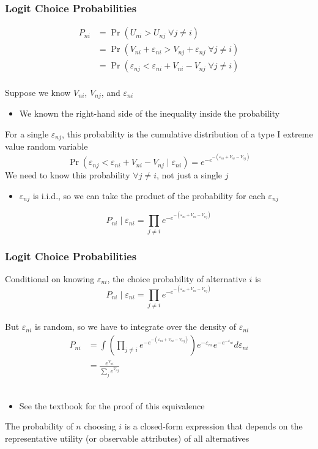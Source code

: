 \documentclass{beamer}
\begin{document}
\begin{frame}\frametitle{Logit Choice Probabilities}
	\vspace{-4ex}
    \begin{align*}
    	P_{ni} & = \Pr(U_{ni} > U_{nj} \; \forall j \neq i) \\
    	& = \Pr(V_{ni} + \varepsilon_{ni} > V_{nj} + \varepsilon_{nj} \; \forall j \neq i) \\
    	& = \Pr(\varepsilon_{nj} < \varepsilon_{ni} + V_{ni} - V_{nj} \; \forall j \neq i)
    \end{align*} \\
    \vspace{1ex}
    Suppose we know $V_{ni}$, $V_{nj}$, and $\varepsilon_{ni}$
    \begin{itemize}
        \item We known the right-hand side of the inequality inside the probability
    \end{itemize}
    \vspace{2ex}
    For a single $\varepsilon_{nj}$, this probability is the cumulative distribution of a type I extreme value random variable
    $$\Pr(\varepsilon_{nj} < \varepsilon_{ni} + V_{ni} - V_{nj} \mid \varepsilon_{ni}) = e^{-e^{-(\varepsilon_{ni} + V_{ni} - V_{nj})}}$$
    We need to know this probability $\forall j \neq i$, not just a single $j$
    \begin{itemize}
        \item $\varepsilon_{nj}$ is i.i.d., so we can take the product of the probability for each $\varepsilon_{nj}$
    \end{itemize}
    $$P_{ni} \mid \varepsilon_{ni} = \prod_{j \neq i} e^{-e^{-(\varepsilon_{ni} + V_{ni} - V_{nj})}}$$
\end{frame}

\begin{frame}\frametitle{Logit Choice Probabilities}
    Conditional on knowing $\varepsilon_{ni}$, the choice probability of alternative $i$ is
    $$P_{ni} \mid \varepsilon_{ni} = \prod_{j \neq i} e^{-e^{-(\varepsilon_{ni} + V_{ni} - V_{nj})}}$$ \\
    But $\varepsilon_{ni}$ is random, so we have to integrate over the density of $\varepsilon_{ni}$
    \begin{align*}
        P_{ni} & = \int \left( \prod_{j \neq i} e^{-e^{-(\varepsilon_{ni} + V_{ni} - V_{nj})}} \right) e^{-\varepsilon_{ni}} e^{-e^{-\varepsilon_{ni}}} d\varepsilon_{ni} \\
        & = \frac{e^{V_{ni}}}{\sum_j e^{V_{nj}}}
    \end{align*} \\
    \vspace{-1ex}
    \begin{itemize}
        \item See the textbook for the proof of this equivalence
    \end{itemize}
    \vspace{2ex}
    The probability of $n$ choosing $i$ is a closed-form expression that depends on the representative utility (or observable attributes) of all alternatives
\end{frame}
\end{document}
